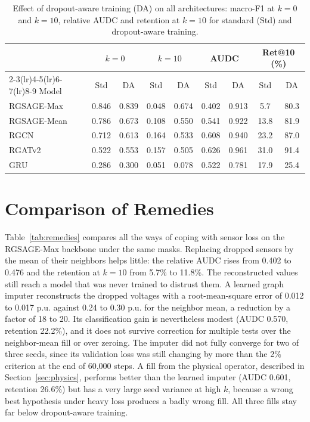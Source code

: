 \documentclass[MTech]{ugthesis}
\begin{document}
\begin{table}[htbp]
\caption{Effect of dropout-aware training (DA) on all architectures: macro-F1 at $k=0$ and $k=10$, relative \acs{AUDC} and retention at $k=10$ for standard (Std) and dropout-aware training.}
\label{tab:aware}
\small
\centering
\begin{tabular}{@{}lcccccccc@{}}
\toprule
 & \multicolumn{2}{c}{$k=0$} & \multicolumn{2}{c}{$k=10$} & \multicolumn{2}{c}{AUDC} & \multicolumn{2}{c}{Ret@10 (\%)} \\
\cmidrule(lr){2-3}\cmidrule(lr){4-5}\cmidrule(lr){6-7}\cmidrule(lr){8-9}
Model & Std & DA & Std & DA & Std & DA & Std & DA \\
\midrule
RGSAGE-Max & 0.846 & 0.839 & 0.048 & 0.674 & 0.402 & 0.913 & 5.7 & 80.3 \\
RGSAGE-Mean & 0.786 & 0.673 & 0.108 & 0.550 & 0.541 & 0.922 & 13.8 & 81.9 \\
RGCN & 0.712 & 0.613 & 0.164 & 0.533 & 0.608 & 0.940 & 23.2 & 87.0 \\
RGATv2 & 0.522 & 0.553 & 0.157 & 0.505 & 0.626 & 0.961 & 31.0 & 91.4 \\
GRU & 0.286 & 0.300 & 0.051 & 0.078 & 0.522 & 0.781 & 17.9 & 25.4 \\
\bottomrule
\end{tabular}
\end{table}

\section{Comparison of Remedies}

Table~\ref{tab:remedies} compares all the ways of coping with sensor loss on the RGSAGE-Max backbone under the same masks. Replacing dropped sensors by the mean of their neighbors helps little: the relative \ac{AUDC} rises from 0.402 to 0.476 and the retention at $k=10$ from 5.7\% to 11.8\%. The reconstructed values still reach a model that was never trained to distrust them. A learned graph imputer reconstructs the dropped voltages with a root-mean-square error of 0.012 to 0.017 p.u. against 0.24 to 0.30 p.u. for the neighbor mean, a reduction by a factor of 18 to 20. Its classification gain is nevertheless modest (\ac{AUDC} 0.570, retention 22.2\%), and it does not survive correction for multiple tests over the neighbor-mean fill or over zeroing. The imputer did not fully converge for two of three seeds, since its validation loss was still changing by more than the 2\% criterion at the end of 60,000 steps. A fill from the physical operator, described in Section~\ref{sec:physics}, performs better than the learned imputer (\ac{AUDC} 0.601, retention 26.6\%) but has a very large seed variance at high $k$, because a wrong best hypothesis under heavy loss produces a badly wrong fill. All three fills stay far below dropout-aware training.
\end{document}
